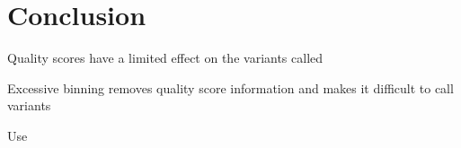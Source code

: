 \documentclass{report}
\begin{document}
\section{Conclusion}
\begin{outline}
\item Quality scores have a limited effect on the variants called
\item Excessive binning removes quality score information and makes it difficult to call variants
\item Use

\end{outline}

\printbibliography
\end{document}

